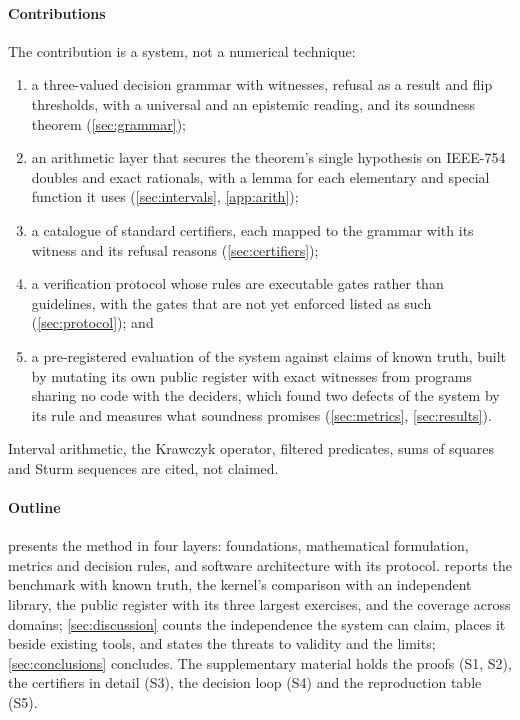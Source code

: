 \documentclass[preprint,11pt,a4paper]{elsarticle}
\theoremstyle{definition}
\begin{document}
\paragraph{Contributions}
The contribution is a system, not a numerical technique:
\begin{enumerate}
\item a three-valued decision grammar with witnesses, refusal as a result and flip thresholds, with a universal and an epistemic reading, and its soundness theorem (\cref{sec:grammar});
\item an arithmetic layer that secures the theorem's single hypothesis on IEEE-754 doubles and exact rationals, with a lemma for each elementary and special function it uses (\cref{sec:intervals}, \ref{app:arith});
\item a catalogue of standard certifiers, each mapped to the grammar with its witness and its refusal reasons (\cref{sec:certifiers});
\item a verification protocol whose rules are executable gates rather than guidelines, with the gates that are not yet enforced listed as such (\cref{sec:protocol}); and
\item a pre-registered evaluation of the system against claims of known truth, built by mutating its own public register with exact witnesses from programs sharing no code with the deciders, which found two defects of the system by its rule and measures what soundness promises (\cref{sec:metrics}, \cref{sec:results}).
\end{enumerate}
Interval arithmetic, the Krawczyk operator, filtered predicates, sums of squares and Sturm sequences are cited, not claimed.

\paragraph{Outline}
 presents the method in four layers: foundations, mathematical formulation, metrics and decision rules, and software architecture with its protocol.  reports the benchmark with known truth, the kernel's comparison with an independent library, the public register with its three largest exercises, and the coverage across domains; \cref{sec:discussion} counts the independence the system can claim, places it beside existing tools, and states the threats to validity and the limits; \cref{sec:conclusions} concludes. The supplementary material holds the proofs (S1, S2), the certifiers in detail (S3), the decision loop (S4) and the reproduction table (S5).
\end{document}
